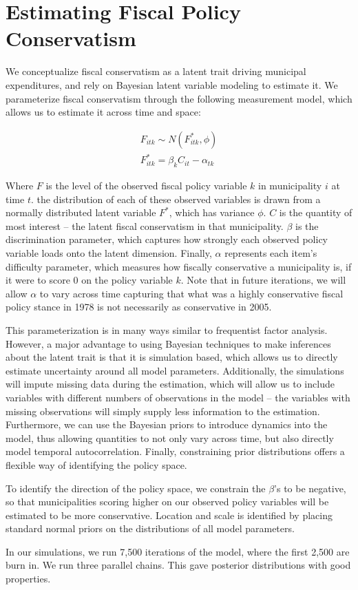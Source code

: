 \documentclass[12pt,a4]{article}
\begin{document}
\section*{Estimating Fiscal Policy Conservatism}

We conceptualize fiscal conservatism as a latent trait driving municipal expenditures, and rely on Bayesian latent variable modeling to estimate it. We parameterize fiscal conservatism through the following measurement model, which allows us to estimate it across time and space:

\begin{gather*}
F_{itk} \sim N(F^*_{itk}, \phi)\\
F^*_{itk} = \beta_k C_{it} - \alpha_{tk}
\end{gather*}

\noindent Where $F$ is the level of the observed fiscal policy variable $k$ in municipality $i$ at time $t$. the distribution of each of these observed variables is drawn from a normally distributed latent variable $F^*$, which has variance $\phi$. $C$ is the quantity of most interest -- the latent fiscal conservatism in that municipality. $\beta$ is the discrimination parameter, which captures how strongly each observed policy variable loads onto the latent dimension. Finally, $\alpha$ represents each item's difficulty parameter, which measures how fiscally conservative a municipality is, if it were to score 0 on the policy variable $k$. Note that in future iterations, we will allow $\alpha$ to vary across time capturing that what was a highly conservative fiscal policy stance in 1978 is not necessarily as conservative in 2005.

This parameterization is in many ways similar to frequentist factor analysis. However, a major advantage to using Bayesian techniques to make inferences about the latent trait is that it is simulation based, which allows us to directly estimate uncertainty around all model parameters. Additionally, the simulations will impute missing data during the estimation, which will allow us to include variables with different numbers of observations in the model -- the variables with missing observations will simply supply less information to the estimation. Furthermore, we can use the Bayesian priors to introduce dynamics into the model, thus allowing quantities to not only vary across time, but also directly model temporal autocorrelation. Finally, constraining prior distributions offers a flexible way of identifying the policy space.

To identify the direction of the policy space, we constrain the $\beta$'s to be negative, so that municipalities scoring higher on our observed policy variables will be estimated to be more conservative. Location and scale is identified by placing standard normal priors on the distributions of all model parameters.

In our simulations, we run 7,500 iterations of the model, where the first 2,500 are burn in. We run three parallel chains. This gave posterior distributions with good properties.
\end{document}
